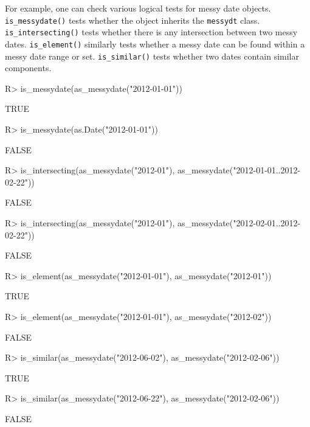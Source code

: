 \documentclass[
]{jss}
\begin{document}
For example, one can check various logical tests for messy date objects.
\texttt{is\_messydate()} tests whether the object inherits the
\texttt{messydt} class. \texttt{is\_intersecting()} tests whether there
is any intersection between two messy dates. \texttt{is\_element()}
similarly tests whether a messy date can be found within a messy date
range or set. \texttt{is\_similar()} tests whether two dates contain
similar components.

\begin{CodeChunk}
\begin{CodeInput}
R> is_messydate(as_messydate("2012-01-01"))
\end{CodeInput}
\begin{CodeOutput}
[1] TRUE
\end{CodeOutput}
\begin{CodeInput}
R> is_messydate(as.Date("2012-01-01"))
\end{CodeInput}
\begin{CodeOutput}
[1] FALSE
\end{CodeOutput}
\begin{CodeInput}
R> is_intersecting(as_messydate("2012-01"), as_messydate("2012-01-01..2012-02-22"))
\end{CodeInput}
\begin{CodeOutput}
[1] FALSE
\end{CodeOutput}
\begin{CodeInput}
R> is_intersecting(as_messydate("2012-01"), as_messydate("2012-02-01..2012-02-22"))
\end{CodeInput}
\begin{CodeOutput}
[1] FALSE
\end{CodeOutput}
\begin{CodeInput}
R> is_element(as_messydate("2012-01-01"), as_messydate("2012-01"))
\end{CodeInput}
\begin{CodeOutput}
[1] TRUE
\end{CodeOutput}
\begin{CodeInput}
R> is_element(as_messydate("2012-01-01"), as_messydate("2012-02"))
\end{CodeInput}
\begin{CodeOutput}
[1] FALSE
\end{CodeOutput}
\begin{CodeInput}
R> is_similar(as_messydate("2012-06-02"), as_messydate("2012-02-06"))
\end{CodeInput}
\begin{CodeOutput}
[1] TRUE
\end{CodeOutput}
\begin{CodeInput}
R> is_similar(as_messydate("2012-06-22"), as_messydate("2012-02-06"))
\end{CodeInput}
\begin{CodeOutput}
[1] FALSE
\end{CodeOutput}
\end{CodeChunk}
\end{document}
